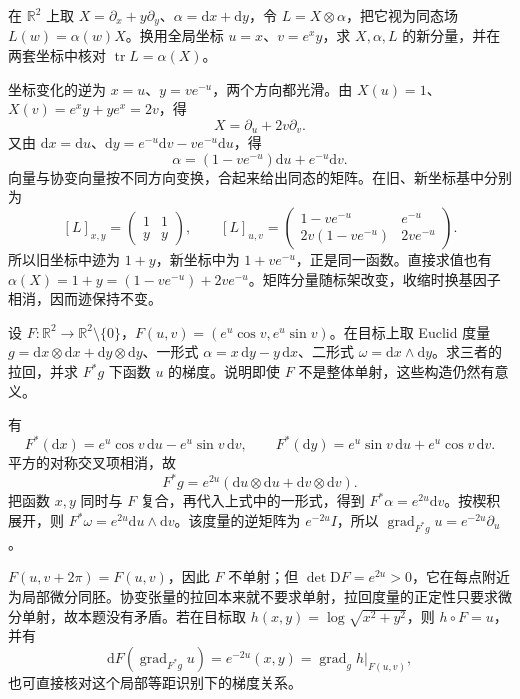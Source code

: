 \begin{exercise}
	\label{g1:ex:tensor-field-changing-frame}
	在 \(\mathbb R^2\) 上取 \(X=\partial_x+y\partial_y\)、\(\alpha=\mathrm{d}x+\mathrm{d}y\)，令 \(L=X\otimes\alpha\)，把它视为同态场 \(L(w)=\alpha(w)X\)。换用全局坐标 \(u=x\)、\(v=e^xy\)，求 \(X,\alpha,L\) 的新分量，并在两套坐标中核对 \(\operatorname{tr}L=\alpha(X)\)。
\end{exercise}
\begin{solution}
	坐标变化的逆为 \(x=u\)、\(y=ve^{-u}\)，两个方向都光滑。由 \(X(u)=1\)、\(X(v)=e^xy+ye^x=2v\)，得
	\[
		X=\partial_u+2v\partial_v.
	\]
	又由 \(\mathrm{d}x=\mathrm{d}u\)、\(\mathrm{d}y=e^{-u}\mathrm{d}v-ve^{-u}\mathrm{d}u\)，得
	\[
		\alpha=(1-ve^{-u})\mathrm{d}u+e^{-u}\mathrm{d}v.
	\]
	向量与协变向量按不同方向变换，合起来给出同态的矩阵。在旧、新坐标基中分别为
	\[
		[L]_{x,y}=\begin{pmatrix}1&1\\y&y\end{pmatrix},\qquad
		[L]_{u,v}=\begin{pmatrix}1-ve^{-u}&e^{-u}\\2v(1-ve^{-u})&2ve^{-u}\end{pmatrix}.
	\]
	所以旧坐标中迹为 \(1+y\)，新坐标中为 \(1+ve^{-u}\)，正是同一函数。直接求值也有 \(\alpha(X)=1+y=(1-ve^{-u})+2ve^{-u}\)。矩阵分量随标架改变，收缩时换基因子相消，因而迹保持不变。
\end{solution}

\begin{exercise}
	\label{g1:ex:exponential-polar-pullbacks}
	设 \(F:\mathbb R^2\to\mathbb R^2\setminus\{0\}\)，\(F(u,v)=(e^u\cos v,e^u\sin v)\)。在目标上取 Euclid 度量 \(g=\mathrm{d}x\otimes\mathrm{d}x+\mathrm{d}y\otimes\mathrm{d}y\)、一形式 \(\alpha=x\,\mathrm{d}y-y\,\mathrm{d}x\)、二形式 \(\omega=\mathrm{d}x\wedge\mathrm{d}y\)。求三者的拉回，并求 \(F^*g\) 下函数 \(u\) 的梯度。说明即使 \(F\) 不是整体单射，这些构造仍然有意义。
\end{exercise}
\begin{solution}
	有
	\[
		F^*(\mathrm{d}x)=e^u\cos v\,\mathrm{d}u-e^u\sin v\,\mathrm{d}v,
		\qquad
		F^*(\mathrm{d}y)=e^u\sin v\,\mathrm{d}u+e^u\cos v\,\mathrm{d}v.
	\]
	平方的对称交叉项相消，故
	\[
		F^*g=e^{2u}(\mathrm{d}u\otimes\mathrm{d}u+\mathrm{d}v\otimes\mathrm{d}v).
	\]
	把函数 \(x,y\) 同时与 \(F\) 复合，再代入上式中的一形式，得到 \(F^*\alpha=e^{2u}\mathrm{d}v\)。按楔积展开，则 \(F^*\omega=e^{2u}\mathrm{d}u\wedge\mathrm{d}v\)。该度量的逆矩阵为 \(e^{-2u}I\)，所以 \(\operatorname{grad}_{F^*g}u=e^{-2u}\partial_u\)。

	\(F(u,v+2\pi)=F(u,v)\)，因此 \(F\) 不单射；但 \(\det \mathrm{D}F=e^{2u}>0\)，它在每点附近为局部微分同胚。协变张量的拉回本来就不要求单射，拉回度量的正定性只要求微分单射，故本题没有矛盾。若在目标取 \(h(x,y)=\log\sqrt{x^2+y^2}\)，则 \(h\circ F=u\)，并有
	\[
		\mathrm{d}F(\operatorname{grad}_{F^*g}u)
		=e^{-2u}(x,y)=\operatorname{grad}_g h\big|_{F(u,v)},
	\]
	也可直接核对这个局部等距识别下的梯度关系。
\end{solution}

